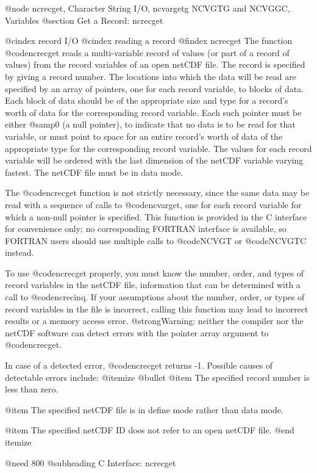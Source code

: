 @node ncrecget, Character String I/O, ncvargetg NCVGTG and NCVGGC, Variables
@section Get a Record:  ncrecget

@cindex record I/O
@cindex reading a record
@findex ncrecget
The function @code{ncrecget} reads a multi-variable record of values (or
part of a record of values) from the record variables of an open netCDF
file.  The record is specified by giving a record number.  The locations
into which the data will be read are specified by an array of pointers,
one for each record variable, to blocks of data.  Each block of data
should be of the appropriate size and type for a record's worth of data
for the corresponding record variable.  Each such pointer must be either
@samp{0} (a null pointer), to indicate that no data is to be read for that variable, or
must point to space for an entire record's worth of data of the
appropriate type for the corresponding record variable.  The values for
each record variable will be ordered with the last dimension of the
netCDF variable varying
fastest.  The netCDF file must be in data mode.

The @code{ncrecget} function is not strictly necessary, since the same
data may be read with a sequence of calls to @code{ncvarget}, one for
each record variable for which a non-null pointer is specified.  This
function is provided in the C interface for convenience only; no
corresponding FORTRAN interface is available, so FORTRAN users should
use multiple calls to @code{NCVGT} or @code{NCVGTC} instead.

To use @code{ncrecget} properly, you must know the number, order, and
types of record variables in the netCDF file, information that can be
determined with a call to @code{ncrecinq}.  If your assumptions about
the number, order, or types of record variables in the file is
incorrect, calling this function may lead to incorrect results or a
memory access error.  @strong{Warning: neither the compiler nor the
netCDF software can detect errors with the pointer array argument to
@code{ncrecget}.}

In case of a detected error, @code{ncrecget} returns -1.  Possible
causes of detectable errors include:
@itemize @bullet
@item
The specified record number is less than zero.

@item
The specified netCDF file is in define mode rather than data mode.

@item
The specified netCDF ID does not refer to an open netCDF file.
@end itemize

@need 800
@subheading C Interface:  ncrecget

